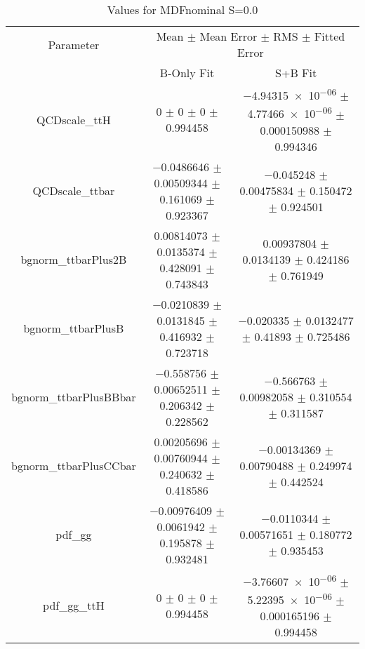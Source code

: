 \begin{table}
\centering
\caption{Values for MDFnominal S=0.0}
\begin{tabular}{ccc}
\toprule
Parameter & \multicolumn{2}{c}{Mean $\pm$ Mean Error $\pm$ RMS $\pm$ Fitted Error}\\
 & B-Only Fit & S+B Fit\\
\midrule
QCDscale\_ttH & \num{0} $\pm$ \num{0} $\pm$ \num{0} $\pm$ \num{0.994458} & \num{-4.94315e-06} $\pm$ \num{4.77466e-06} $\pm$ \num{0.000150988} $\pm$ \num{0.994346}\\
QCDscale\_ttbar & \num{-0.0486646} $\pm$ \num{0.00509344} $\pm$ \num{0.161069} $\pm$ \num{0.923367} & \num{-0.045248} $\pm$ \num{0.00475834} $\pm$ \num{0.150472} $\pm$ \num{0.924501}\\
bgnorm\_ttbarPlus2B & \num{0.00814073} $\pm$ \num{0.0135374} $\pm$ \num{0.428091} $\pm$ \num{0.743843} & \num{0.00937804} $\pm$ \num{0.0134139} $\pm$ \num{0.424186} $\pm$ \num{0.761949}\\
bgnorm\_ttbarPlusB & \num{-0.0210839} $\pm$ \num{0.0131845} $\pm$ \num{0.416932} $\pm$ \num{0.723718} & \num{-0.020335} $\pm$ \num{0.0132477} $\pm$ \num{0.41893} $\pm$ \num{0.725486}\\
bgnorm\_ttbarPlusBBbar & \num{-0.558756} $\pm$ \num{0.00652511} $\pm$ \num{0.206342} $\pm$ \num{0.228562} & \num{-0.566763} $\pm$ \num{0.00982058} $\pm$ \num{0.310554} $\pm$ \num{0.311587}\\
bgnorm\_ttbarPlusCCbar & \num{0.00205696} $\pm$ \num{0.00760944} $\pm$ \num{0.240632} $\pm$ \num{0.418586} & \num{-0.00134369} $\pm$ \num{0.00790488} $\pm$ \num{0.249974} $\pm$ \num{0.442524}\\
pdf\_gg & \num{-0.00976409} $\pm$ \num{0.0061942} $\pm$ \num{0.195878} $\pm$ \num{0.932481} & \num{-0.0110344} $\pm$ \num{0.00571651} $\pm$ \num{0.180772} $\pm$ \num{0.935453}\\
pdf\_gg\_ttH & \num{0} $\pm$ \num{0} $\pm$ \num{0} $\pm$ \num{0.994458} & \num{-3.76607e-06} $\pm$ \num{5.22395e-06} $\pm$ \num{0.000165196} $\pm$ \num{0.994458}\\
\bottomrule
\end{tabular}
\end{table}